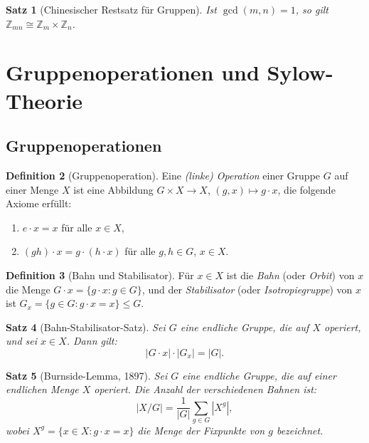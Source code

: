 \documentclass[12pt,a4paper]{amsart}
\newtheorem{theorem}{Satz}[section]
\theoremstyle{definition}
\newtheorem{definition}[theorem]{Definition}
\begin{document}
\begin{theorem}[Chinesischer Restsatz für Gruppen]
Ist $\gcd(m,n) = 1$, so gilt $\mathbb{Z}_{mn} \cong \mathbb{Z}_m \times \mathbb{Z}_n$.
\end{theorem}

\section{Gruppenoperationen und Sylow-Theorie}
\label{sec:operationen}

\subsection{Gruppenoperationen}

\begin{definition}[Gruppenoperation]
Eine \emph{(linke) Operation} einer Gruppe $G$ auf einer Menge $X$ ist eine Abbildung
$G \times X \to X$, $(g,x) \mapsto g \cdot x$, die folgende Axiome erfüllt:
\begin{enumerate}[label=(\roman*)]
  \item $e \cdot x = x$ für alle $x \in X$,
  \item $(gh) \cdot x = g \cdot (h \cdot x)$ für alle $g,h \in G$, $x \in X$.
\end{enumerate}
\end{definition}

\begin{definition}[Bahn und Stabilisator]
Für $x \in X$ ist die \emph{Bahn} (oder \emph{Orbit}) von $x$ die Menge
$G \cdot x = \{g \cdot x : g \in G\}$, und der \emph{Stabilisator} (oder \emph{Isotropiegruppe})
von $x$ ist $G_x = \{g \in G : g \cdot x = x\} \leq G$.
\end{definition}

\begin{theorem}[Bahn-Stabilisator-Satz]
\label{thm:bahn_stab}
Sei $G$ eine endliche Gruppe, die auf $X$ operiert, und sei $x \in X$. Dann gilt:
\[
  |G \cdot x| \cdot |G_x| = |G|.
\]
\end{theorem}

\begin{theorem}[Burnside-Lemma, 1897]
\label{thm:burnside}
Sei $G$ eine endliche Gruppe, die auf einer endlichen Menge $X$ operiert. Die Anzahl
der verschiedenen Bahnen ist:
\[
  |X/G| = \frac{1}{|G|} \sum_{g \in G} |X^g|,
\]
wobei $X^g = \{x \in X : g \cdot x = x\}$ die Menge der Fixpunkte von $g$ bezeichnet.
\end{theorem}
\end{document}
